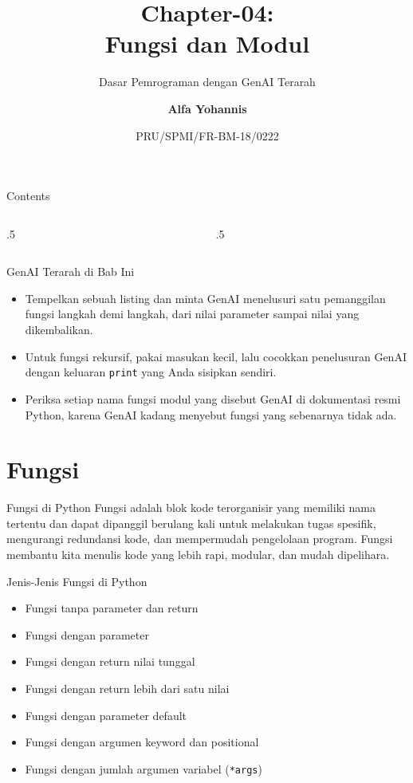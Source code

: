 \documentclass[aspectratio=169, table]{beamer}
\subtitle{Dasar Pemrograman dengan GenAI Terarah}
\title{Chapter-04:\\\LARGE{Fungsi dan Modul\\}
\vspace{10pt}}
\date[Serial]{\scriptsize {PRU/SPMI/FR-BM-18/0222}}
\author[Pradita]{\small{\textbf{Alfa Yohannis}}}
\begin{document}
\frame{\titlepage}

\begin{frame}[fragile]{Contents}
\vspace{15pt}
\begin{columns}[t]
\begin{column}{.5\textwidth}
\tableofcontents[sections={1}]
\end{column}
\begin{column}{.5\textwidth}
\tableofcontents[sections={2-4}]
\end{column}
\end{columns}
\end{frame}

\begin{frame}{GenAI Terarah di Bab Ini}
\small
\begin{itemize}
  \item Tempelkan sebuah listing dan minta GenAI menelusuri satu pemanggilan fungsi langkah demi langkah, dari nilai parameter sampai nilai yang dikembalikan.
  \item Untuk fungsi rekursif, pakai masukan kecil, lalu cocokkan penelusuran GenAI dengan keluaran \texttt{print} yang Anda sisipkan sendiri.
  \item Periksa setiap nama fungsi modul yang disebut GenAI di dokumentasi resmi Python, karena GenAI kadang menyebut fungsi yang sebenarnya tidak ada.
\end{itemize}
\end{frame}

\section{Fungsi}

\begin{frame}{Fungsi di Python}
Fungsi adalah blok kode terorganisir yang memiliki nama tertentu dan dapat dipanggil berulang kali untuk melakukan tugas spesifik, mengurangi redundansi kode, dan mempermudah pengelolaan program. Fungsi membantu kita menulis kode yang lebih rapi, modular, dan mudah dipelihara.
\end{frame}

\begin{frame}{Jenis-Jenis Fungsi di Python}
    \begin{itemize}
        \item Fungsi tanpa parameter dan return
        \item Fungsi dengan parameter
        \item Fungsi dengan return nilai tunggal
        \item Fungsi dengan return lebih dari satu nilai
        \item Fungsi dengan parameter default
        \item Fungsi dengan argumen keyword dan positional
        \item Fungsi dengan jumlah argumen variabel (\texttt{*args})
    \end{itemize}
\end{frame}
\end{document}
